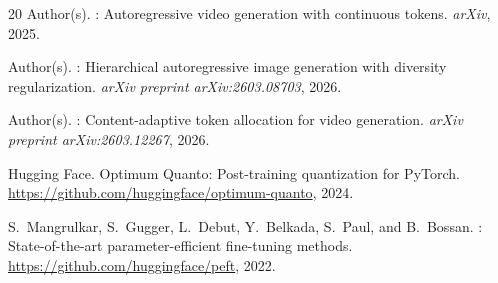 \documentclass[10pt,twocolumn]{article}
\begin{document}
\begin{thebibliography}{20}
Author(s).
: Autoregressive video generation with continuous tokens.
\newblock \emph{arXiv}, 2025.

Author(s).
: Hierarchical autoregressive image generation with diversity
  regularization.
\newblock \emph{arXiv preprint arXiv:2603.08703}, 2026.

Author(s).
: Content-adaptive token allocation for video generation.
\newblock \emph{arXiv preprint arXiv:2603.12267}, 2026.

Hugging Face.
\newblock Optimum Quanto: Post-training quantization for PyTorch.
\newblock \url{https://github.com/huggingface/optimum-quanto}, 2024.

S.~Mangrulkar, S.~Gugger, L.~Debut, Y.~Belkada, S.~Paul, and B.~Bossan.
: State-of-the-art parameter-efficient fine-tuning methods.
\newblock \url{https://github.com/huggingface/peft}, 2022.

\end{thebibliography}
\end{document}
